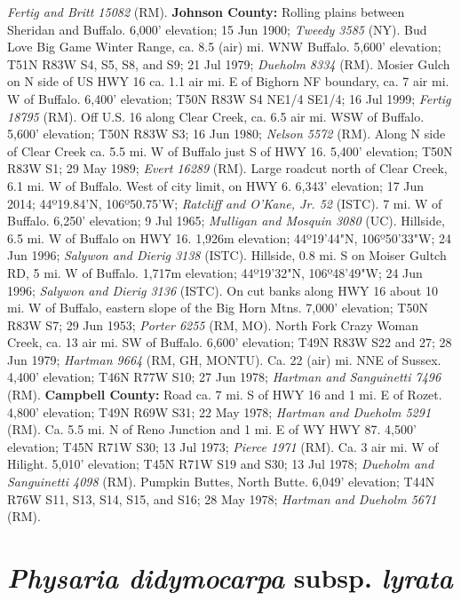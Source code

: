 \textit{Fertig and Britt 15082} (RM).
  \textbf{Johnson County:}
Rolling plains between Sheridan and Buffalo. 6,000' elevation; 15 Jun 1900;
\textit{Tweedy 3585} (NY).
Bud Love Big Game Winter Range, ca. 8.5 (air) mi. WNW Buffalo. 5,600' elevation;
T51N R83W S4, S5, S8, and S9; 21 Jul 1979; \textit{Dueholm 8334} (RM).
Mosier Gulch on N side of US HWY 16 ca. 1.1 air mi. E of Bighorn NF boundary,
ca. 7 air mi. W of Buffalo. 6,400' elevation; T50N R83W S4 NE1/4 SE1/4;
16 Jul 1999; \textit{Fertig 18795} (RM).
Off U.S. 16 along Clear Creek, ca. 6.5 air mi. WSW of Buffalo.
5,600' elevation; T50N R83W S3; 16 Jun 1980; \textit{Nelson 5572} (RM).
Along N side of Clear Creek ca. 5.5 mi. W of Buffalo just S of HWY 16.
5,400' elevation; T50N R83W S1; 29 May 1989; \textit{Evert 16289} (RM).
Large roadcut north of Clear Creek, 6.1 mi. W of Buffalo. West of city limit,
on HWY 6. 6,343' elevation; 17 Jun 2014; 44º19.84'N, 106º50.75'W;
\textit{Ratcliff and O'Kane, Jr. 52} (ISTC).
7 mi. W of Buffalo. 6,250' elevation; 9 Jul 1965;
\textit{Mulligan and Mosquin 3080} (UC).
Hillside, 6.5 mi. W of Buffalo on HWY 16. 1,926m elevation; 44º19'44"N,
106º50'33"W; 24 Jun 1996; \textit{Salywon and Dierig 3138} (ISTC).
Hillside, 0.8 mi. S on Moiser Gultch RD, 5 mi. W of Buffalo. 1,717m elevation;
44º19'32"N, 106º48'49"W; 24 Jun 1996; \textit{Salywon and Dierig 3136} (ISTC).
On cut banks along HWY 16 about 10 mi. W of Buffalo, eastern slope of the
Big Horn Mtns. 7,000' elevation; T50N R83W S7; 29 Jun 1953;
\textit{Porter 6255} (RM, MO).
North Fork Crazy Woman Creek, ca. 13 air mi. SW of Buffalo. 6,600' elevation;
T49N R83W S22 and 27; 28 Jun 1979; \textit{Hartman 9664} (RM, GH, MONTU).
Ca. 22 (air) mi. NNE of Sussex. 4,400' elevation; T46N R77W S10; 27 Jun 1978;
\textit{Hartman and Sanguinetti 7496} (RM).
  \textbf{Campbell County:}
Road ca. 7 mi. S of HWY 16 and 1 mi. E of Rozet. 4,800' elevation;
T49N R69W S31; 22 May 1978; \textit{Hartman and Dueholm 5291} (RM).
Ca. 5.5 mi. N of Reno Junction and 1 mi. E of WY HWY 87. 4,500' elevation;
T45N R71W S30; 13 Jul 1973; \textit{Pierce 1971} (RM).
Ca. 3 air mi. W of Hilight. 5,010' elevation; T45N R71W S19 and S30;
13 Jul 1978; \textit{Dueholm and Sanguinetti 4098} (RM).
Pumpkin Buttes, North Butte. 6,049' elevation; T44N R76W S11, S13, S14, S15,
and S16; 28 May 1978; \textit{Hartman and Dueholm 5671} (RM).

\section*{\textit{Physaria didymocarpa} subsp. \textit{lyrata}}


